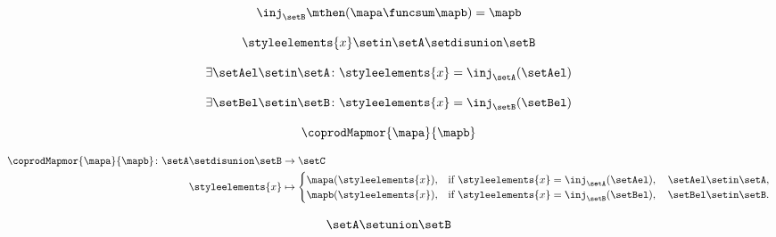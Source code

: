 {\begin{forslides}
        \begin{equation}
            \label{eq:combination-102}
            \inj_\setB\mthen (\mapa \funcsum \mapb)=\mapb
        \end{equation}

        \begin{equation}
            \label{eq:combination-103}
            \styleelements{x}\setin \setA \setdisunion \setB
        \end{equation}

        \begin{equation}
            \label{eq:combination-104}
            \exists \setAel\setin \setA\colon \styleelements{x}=\inj_\setA(\setAel)
        \end{equation}

        \begin{equation}
            \label{eq:combination-105}
            \exists \setBel\setin \setB\colon \styleelements{x}=\inj_\setB(\setBel)
        \end{equation}

        \begin{equation}
            \label{eq:combination-106}
            \coprodMapmor{\mapa}{\mapb}
        \end{equation}

        \begin{equation}
            \label{eq:combination-107}
            \begin{aligned}
                \coprodMapmor{\mapa}{\mapb} \colon  \setA \setdisunion \setB & \to \setC \\
                \styleelements{x}                                            & \mapsto
                \begin{cases}
                    \mapa(\styleelements{x}), & \text{if } \styleelements{x}=\inj_\setA(\setAel),\quad \setAel \setin \setA, \\
                    \mapb(\styleelements{x}), & \text{if } \styleelements{x}=\inj_\setB(\setBel),\quad \setBel \setin \setB.
                \end{cases}
            \end{aligned}
        \end{equation}

        \begin{equation}
            \label{eq:combination-108}
            \setA\setunion \setB
        \end{equation}


\end{forslides}}
